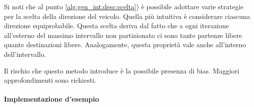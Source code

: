\documentclass[../../../../relazione.tex]{subfiles}
\begin{document}
Si noti che al punto \ref{alg:gen_int:desc:scelta}) è possibile adottare varie strategie per la scelta della direzione del veicolo.
Quella più intuitiva è considerare ciascuna direzione equiprobabile.
Questa scelta deriva dal fatto che a ogni iterazione all'esterno del massimo intervallo non partizionato ci sono tante partenze libere quante destinazioni libere.
Analogamente, questa proprietà vale anche all'interno dell'intervallo.

Il rischio che questo metodo introduce è la possibile presenza di bias.
Maggiori approfondimenti sono richiesti.

\paragraph{Implementazione d'esempio}

\end{document}
